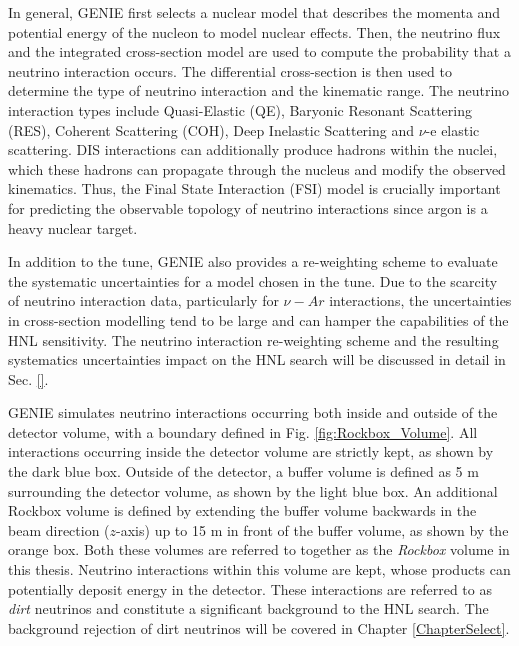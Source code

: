 In general, GENIE first selects a nuclear model that describes the momenta and potential energy of the nucleon to model nuclear effects.                                                                                           
Then, the neutrino flux and the integrated cross-section model are used to compute the probability that a neutrino interaction occurs.
The differential cross-section is then used to determine the type of neutrino interaction and the kinematic range.
The neutrino interaction types include Quasi-Elastic (QE), Baryonic Resonant Scattering (RES), Coherent Scattering (COH), Deep Inelastic Scattering and $\nu$-e elastic scattering.
DIS interactions can additionally produce hadrons within the nuclei, which these hadrons can propagate through the nucleus and modify the observed kinematics.
Thus, the Final State Interaction (FSI) model is crucially important for predicting the observable topology of neutrino interactions since argon is a heavy nuclear target.

In addition to the tune, GENIE also provides a re-weighting scheme to evaluate the systematic uncertainties for a model chosen in the tune.
Due to the scarcity of neutrino interaction data, particularly for $\nu-Ar$ interactions, the uncertainties in cross-section modelling tend to be large and can hamper the capabilities of the HNL sensitivity.  
The neutrino interaction re-weighting scheme and the resulting systematics uncertainties impact on the HNL search will be discussed in detail in Sec. \ref{}.

GENIE simulates neutrino interactions occurring both inside and outside of the detector volume, with a boundary defined in Fig. \ref{fig:Rockbox_Volume}.  
All interactions occurring inside the detector volume are strictly kept, as shown by the dark blue box.
Outside of the detector, a buffer volume is defined as 5 m surrounding the detector volume, as shown by the light blue box.                       
An additional Rockbox volume is defined by extending the buffer volume backwards in the beam direction ($z$-axis) up to 15 m in front of the buffer volume, as shown by the orange box.
Both these volumes are referred to together as the \textit{Rockbox} volume in this thesis.
Neutrino interactions within this volume are kept, whose products can potentially deposit energy in the detector.
These interactions are referred to as \textit{dirt} neutrinos and constitute a significant background to the HNL search.
The background rejection of dirt neutrinos will be covered in Chapter \ref{ChapterSelect}.

